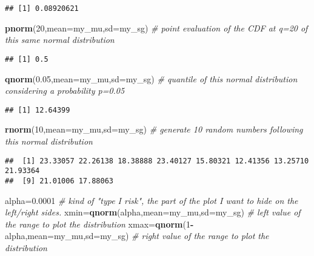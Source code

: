 \documentclass[
]{article}
\newenvironment{Shaded}{\begin{snugshade}}{\end{snugshade}}
\newcommand{\AttributeTok}[1]{\textcolor[rgb]{0.13,0.29,0.53}{#1}}
\newcommand{\CommentTok}[1]{\textcolor[rgb]{0.56,0.35,0.01}{\textit{#1}}}
\newcommand{\DecValTok}[1]{\textcolor[rgb]{0.00,0.00,0.81}{#1}}
\newcommand{\FloatTok}[1]{\textcolor[rgb]{0.00,0.00,0.81}{#1}}
\newcommand{\FunctionTok}[1]{\textcolor[rgb]{0.13,0.29,0.53}{\textbf{#1}}}
\newcommand{\NormalTok}[1]{#1}
\newcommand{\OtherTok}[1]{\textcolor[rgb]{0.56,0.35,0.01}{#1}}
\newcommand{\SpecialCharTok}[1]{\textcolor[rgb]{0.81,0.36,0.00}{\textbf{#1}}}
\begin{document}
\begin{verbatim}
## [1] 0.08920621
\end{verbatim}

\begin{Shaded}
\begin{Highlighting}[]
\FunctionTok{pnorm}\NormalTok{(}\DecValTok{20}\NormalTok{,}\AttributeTok{mean=}\NormalTok{my\_mu,}\AttributeTok{sd=}\NormalTok{my\_sg) }\CommentTok{\# point evaluation of the CDF at q=20 of this same normal distribution}
\end{Highlighting}
\end{Shaded}

\begin{verbatim}
## [1] 0.5
\end{verbatim}

\begin{Shaded}
\begin{Highlighting}[]
\FunctionTok{qnorm}\NormalTok{(}\FloatTok{0.05}\NormalTok{,}\AttributeTok{mean=}\NormalTok{my\_mu,}\AttributeTok{sd=}\NormalTok{my\_sg) }\CommentTok{\# quantile of this normal distribution considering a probability p=0.05}
\end{Highlighting}
\end{Shaded}

\begin{verbatim}
## [1] 12.64399
\end{verbatim}

\begin{Shaded}
\begin{Highlighting}[]
\FunctionTok{rnorm}\NormalTok{(}\DecValTok{10}\NormalTok{,}\AttributeTok{mean=}\NormalTok{my\_mu,}\AttributeTok{sd=}\NormalTok{my\_sg) }\CommentTok{\# generate 10 random numbers following this normal distribution}
\end{Highlighting}
\end{Shaded}

\begin{verbatim}
##  [1] 23.33057 22.26138 18.38888 23.40127 15.80321 12.41356 13.25710 21.93364
##  [9] 21.01006 17.88063
\end{verbatim}

\begin{Shaded}
\begin{Highlighting}[]
\NormalTok{alpha}\OtherTok{=}\FloatTok{0.0001} \CommentTok{\# kind of "type I risk", the part of the plot I want to hide on the left/right sides.}
\NormalTok{xmin}\OtherTok{=}\FunctionTok{qnorm}\NormalTok{(alpha,}\AttributeTok{mean=}\NormalTok{my\_mu,}\AttributeTok{sd=}\NormalTok{my\_sg) }\CommentTok{\# left value of the range to plot the distribution}
\NormalTok{xmax}\OtherTok{=}\FunctionTok{qnorm}\NormalTok{(}\DecValTok{1}\SpecialCharTok{{-}}\NormalTok{alpha,}\AttributeTok{mean=}\NormalTok{my\_mu,}\AttributeTok{sd=}\NormalTok{my\_sg) }\CommentTok{\# right value of the range to plot the distribution}
\end{Highlighting}
\end{Shaded}
\end{document}
